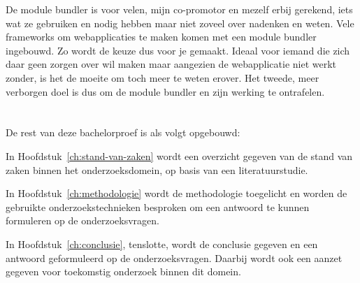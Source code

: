 De module bundler is voor velen, mijn co-promotor en mezelf erbij gerekend, iets wat ze gebruiken en nodig hebben maar niet zoveel over nadenken en weten. Vele frameworks om webapplicaties te maken komen met een module bundler ingebouwd. Zo wordt de keuze dus voor je gemaakt. Ideaal voor iemand die zich daar geen zorgen over wil maken maar aangezien de webapplicatie niet werkt zonder, is het de moeite om toch meer te weten erover. Het tweede, meer verborgen doel is dus om de module bundler en zijn werking te ontrafelen.

\section{}
\label{sec:opzet-bachelorproef}


De rest van deze bachelorproef is als volgt opgebouwd:

In Hoofdstuk~\ref{ch:stand-van-zaken} wordt een overzicht gegeven van de stand van zaken binnen het onderzoeksdomein, op basis van een literatuurstudie.

In Hoofdstuk~\ref{ch:methodologie} wordt de methodologie toegelicht en worden de gebruikte onderzoekstechnieken besproken om een antwoord te kunnen formuleren op de onderzoeksvragen.


In Hoofdstuk~\ref{ch:conclusie}, tenslotte, wordt de conclusie gegeven en een antwoord geformuleerd op de onderzoeksvragen. Daarbij wordt ook een aanzet gegeven voor toekomstig onderzoek binnen dit domein.


